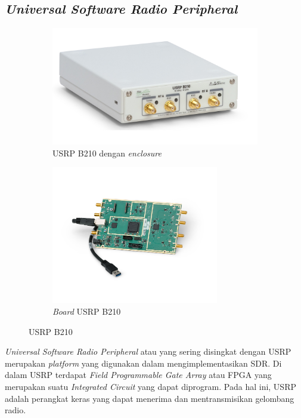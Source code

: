 \subsection{\textit{Universal Software Radio Peripheral}}
\begin{center}
	\begin{figure}[h!]
		\begin{subfigure}[b]{0.5\linewidth}
			\includegraphics[width=\linewidth]{pics/bab2/B210.jpg}
			\caption{USRP B210 dengan \textit{enclosure}}
		\end{subfigure}
		\begin{subfigure}[b]{0.5\linewidth}
			\includegraphics[width=7.3cm]{pics/bab2/B210Board.jpg}
			\caption{\textit{Board} USRP B210}
		\end{subfigure}
		\caption{USRP B210}
		\label{pic:gambarusrp}
	\end{figure}
\end{center}

\textit{Universal Software Radio Peripheral} atau yang sering disingkat dengan USRP merupakan \textit{platform} yang digunakan dalam mengimplementasikan SDR. Di dalam USRP terdapat \textit{Field Programmable Gate Array} atau FPGA yang merupakan suatu \textit{Integrated Circuit} yang dapat diprogram. Pada hal ini, USRP adalah perangkat keras yang dapat menerima dan mentransmisikan gelombang radio.

